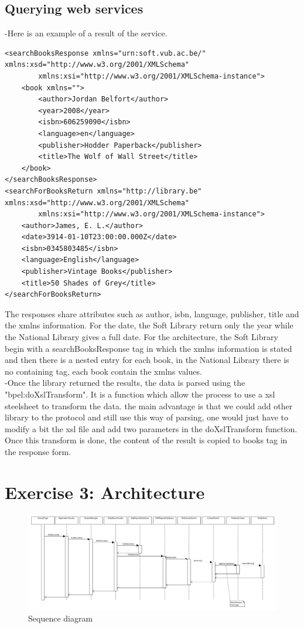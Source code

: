 \documentclass[a4paper,10pt]{article}
\begin{document}
\subsection{Querying web services}
-Here is an example of a result of the service.
\begin{verbatim}
<searchBooksResponse xmlns="urn:soft.vub.ac.be/" xmlns:xsd="http://www.w3.org/2001/XMLSchema"
        xmlns:xsi="http://www.w3.org/2001/XMLSchema-instance">
    <book xmlns="">
        <author>Jordan Belfort</author>
        <year>2008</year>
        <isbn>606259090</isbn>
        <language>en</language>
        <publisher>Hodder Paperback</publisher>
        <title>The Wolf of Wall Street</title>
    </book>
</searchBooksResponse>
<searchForBooksReturn xmlns="http://library.be" xmlns:xsd="http://www.w3.org/2001/XMLSchema" 
        xmlns:xsi="http://www.w3.org/2001/XMLSchema-instance">
    <author>James, E. L.</author>
    <date>3914-01-10T23:00:00.000Z</date>
    <isbn>0345803485</isbn>
    <language>English</language>
    <publisher>Vintage Books</publisher>
    <title>50 Shades of Grey</title>
</searchForBooksReturn>
\end{verbatim}
The responses share attributes such as author, isbn, language, publisher, title and the xmlns information. For the date, the Soft Library return only the year while the National Library gives a full date. For the architecture, the Soft Library begin with a searchBooksResponse tag in which the xmlns information is stated and then there is a nested entry for each book, in the National Library there is no containing tag, each book contain the xmlns values.\\

-Once the library returned the results, the data is parsed using the "bpel:doXslTransform". It is a function which allow the process to use a xsl steelsheet to transform the data. the main advantage is that we could add other library to the protocol and still use this way of parsing, one would just have to modify a bit the xsl file and add two parameters in the doXslTransform function. Once this transform is done, the content of the result is copied to books tag in the response form.
\section{Exercise 3: Architecture}
\clearpage
\begin{landscape}
\begin{figure}[h]
   \includegraphics[scale=0.45]{uml/sequence.png}
   \caption{\label{sequence} Sequence diagram}
\end{figure}
\end{landscape}
\end{document}
